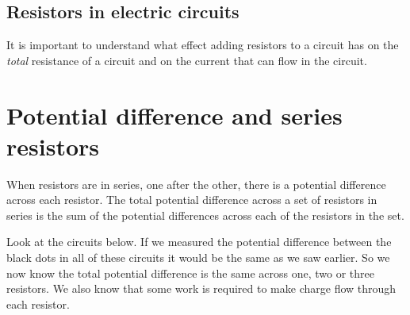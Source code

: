 \subsection*{Resistors in electric circuits}
It is important to understand what effect adding resistors to a circuit has on the \textit{total} resistance of a circuit and on the current that can flow in the circuit. 


\section{Potential difference and series resistors}

When resistors are in series, one after the other, there is a potential difference across each resistor. The total potential difference across a set of resistors in series is the sum of the potential differences across each of the resistors in the set. 

Look at the circuits below. If we measured the potential difference between the black dots in all of these circuits it would be the same as we saw earlier. So we now know the total potential difference is the same across one, two or three resistors. We also know that some work is required to make charge flow through each resistor.


